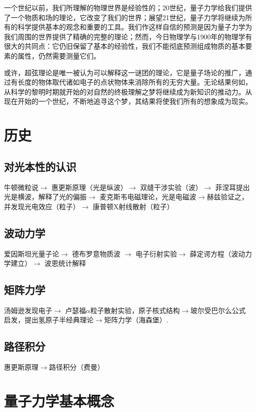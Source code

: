 \documentclass[13pt,a4paper]{article}
\begin{document}
\begin{CJK}{UTF8}{song}
一个世纪以前，我们所理解的物理世界是经验性的；20世纪，量子力学给我们提供了一个物质和场的理论，它改变了我们的世界；展望21世纪，量子力学将继续为所有的科学提供基本的观念和重要的工具。我们作这样自信的预测是因为量子力学为我们周围的世界提供了精确的完整的理论；然而，今日物理学与1900年的物理学有很大的共同点：它仍旧保留了基本的经验性，我们不能彻底预测组成物质的基本要素的属性，仍然需要测量它们。

或许，超弦理论是唯一被认为可以解释这一谜团的理论，它是量子场论的推广，通过有长度的物体取代诸如电子的点状物体来消除所有的无穷大量。无论结果何如，从科学的黎明时期就开始的对自然的终极理解之梦将继续成为新知识的推动力。从现在开始的一个世纪，不断地追寻这个梦，其结果将使我们所有的想象成为现实。



\section{历史}

\subsection{对光本性的认识}
牛顿微粒说$\rightarrow$ 惠更斯原理（光是纵波）$\rightarrow$ 双缝干涉实验（波）$\rightarrow$ 菲涅耳提出光是横波，解释了光的偏振$\rightarrow$ 麦克斯韦电磁理论，光是电磁波$\rightarrow $赫兹验证之，并发现光电效应（粒子）$\rightarrow$ 康普顿X射线散射（粒子） 

\subsection{波动力学}
爱因斯坦光量子论$\rightarrow$ 德布罗意物质波 $\rightarrow$ 电子衍射实验$\rightarrow$ 薛定谔方程（波动力学建立）$\rightarrow$ 波恩统计解释

\subsection{矩阵力学}
汤姆逊发现电子$\rightarrow$ 卢瑟福$\alpha$粒子散射实验，原子核式结构$\rightarrow $玻尔受巴尔么公式启发，提出氢原子半经典理论$\rightarrow $矩阵力学（海森堡）.

\subsection{路径积分}
惠更斯原理$\rightarrow $路径积分（费曼）



\section{量子力学基本概念}


\end{CJK}
\end{document}
